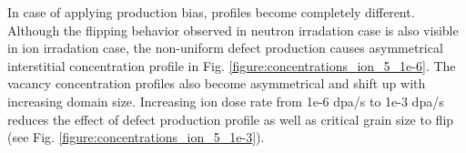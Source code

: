 \documentclass[a4paper]{article}
\begin{document}
      \newpage
      In case of applying production bias, profiles become completely different. Although the flipping behavior observed in neutron irradation case is also visible in ion irradation case, the non-uniform defect production causes asymmetrical interstitial concentration profile in Fig. \ref{figure:concentrations_ion_5_1e-6}. The vacancy concentration profiles also become asymmetrical and shift up with increasing domain size. Increasing ion dose rate from 1e-6 dpa/s to 1e-3 dpa/s reduces the effect of defect production profile as well as critical grain size to flip (see Fig. \ref{figure:concentrations_ion_5_1e-3}).
      \begin{figure}[h!]  %
        \centering
        \qquad

\end{figure}
\end{document}
